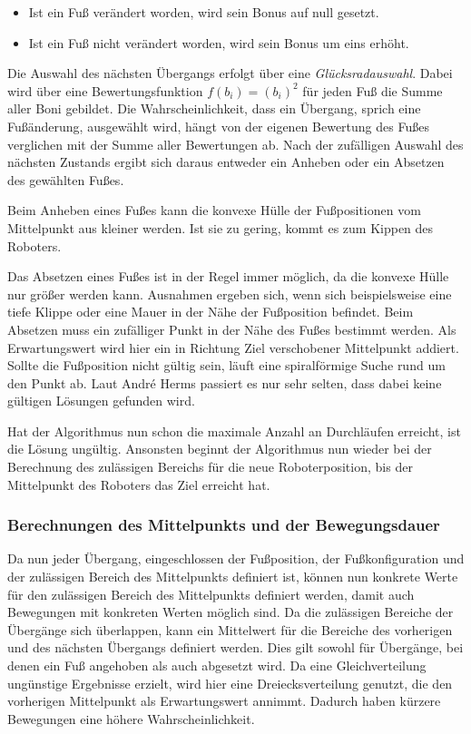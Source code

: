\begin{itemize}
  \item Ist ein Fuß verändert worden, wird sein Bonus auf null gesetzt.
  \item Ist ein Fuß nicht verändert worden, wird sein Bonus um eins erhöht.
\end{itemize}

Die Auswahl des nächsten Übergangs erfolgt über eine \emph{Glücksradauswahl}. Dabei wird über eine Bewertungsfunktion $f(b_i) = (b_i)^2$ für jeden Fuß die Summe aller Boni gebildet. Die Wahrscheinlichkeit, dass ein Übergang, sprich eine Fußänderung, ausgewählt wird, hängt von der eigenen Bewertung des Fußes verglichen mit der Summe aller Bewertungen ab. Nach der zufälligen Auswahl des nächsten Zustands ergibt sich daraus entweder ein Anheben oder ein Absetzen des gewählten Fußes.

Beim Anheben eines Fußes kann die konvexe Hülle der Fußpositionen vom Mittelpunkt aus kleiner werden. Ist sie zu gering, kommt es zum Kippen des Roboters.

Das Absetzen eines Fußes ist in der Regel immer möglich, da die konvexe Hülle nur größer werden kann. Ausnahmen ergeben sich, wenn sich beispielsweise eine tiefe Klippe oder eine Mauer in der Nähe der Fußposition befindet. Beim Absetzen muss ein zufälliger Punkt in der Nähe des Fußes bestimmt werden. Als Erwartungswert wird hier ein in Richtung Ziel verschobener Mittelpunkt addiert. Sollte die Fußposition nicht gültig sein, läuft eine spiralförmige Suche rund um den Punkt ab. Laut André Herms passiert es nur sehr selten, dass dabei keine gültigen Lösungen gefunden wird.

Hat der Algorithmus nun schon die maximale Anzahl an Durchläufen erreicht, ist die Lösung ungültig. Ansonsten beginnt der Algorithmus nun wieder bei der Berechnung des zulässigen Bereichs für die neue Roboterposition, bis der Mittelpunkt des Roboters das Ziel erreicht hat.

\subsubsection{Berechnungen des Mittelpunkts und der Bewegungsdauer}

Da nun jeder Übergang, eingeschlossen der Fußposition, der Fußkonfiguration und der zulässigen Bereich des Mittelpunkts definiert ist, können nun konkrete Werte für den zulässigen Bereich des Mittelpunkts definiert werden, damit auch Bewegungen mit konkreten Werten möglich sind. Da die zulässigen Bereiche der Übergänge sich überlappen, kann ein Mittelwert für die Bereiche des vorherigen und des nächsten Übergangs definiert werden. Dies gilt sowohl für Übergänge, bei denen ein Fuß angehoben als auch abgesetzt wird. Da eine Gleichverteilung ungünstige Ergebnisse erzielt, wird hier eine Dreiecksverteilung genutzt, die den vorherigen Mittelpunkt als Erwartungswert annimmt. Dadurch haben kürzere Bewegungen eine höhere Wahrscheinlichkeit.  

